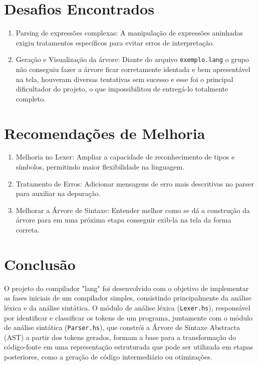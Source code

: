 \documentclass{article}
\begin{document}
\newpage
\section{Desafios Encontrados}
\begin{enumerate}
    \item Parsing de expressões complexas: A manipulação de expressões aninhadas exigiu tratamentos específicos para evitar erros de interpretação. 
    \item Geração e Visualização da árvore: Diante do arquivo \texttt{exemplo.lang} o grupo não conseguiu fazer a árvore ficar corretamente identada e bem apresentável na tela, houveram diversas tentativas sem sucesso e esse foi o principal dificultador do projeto, o que impossibilitou de entregá-lo totalmente completo.
\end{enumerate}

 \section{Recomendações de Melhoria}
 \begin{enumerate}
     \item Melhoria no Lexer: Ampliar a capacidade de reconhecimento de tipos e símbolos, permitindo maior flexibilidade na linguagem. 
    \item Tratamento de Erros: Adicionar mensagens de erro mais descritivas no parser para auxiliar na depuração. 
    \item Melhorar a Árvore de Sintaxe: Entender melhor como se dá a construção da árvore para em uma próxima etapa conseguir exib-la na tela da forma correta.
 \end{enumerate}

\newpage
\section{Conclusão}

O projeto do compilador "lang" foi desenvolvido com o objetivo de implementar as fases iniciais de um compilador simples, consistindo principalmente da análise léxica e da análise sintática. O módulo de análise léxica (\texttt{Lexer.hs}), responsável por identificar e classificar os tokens de um programa, juntamente com o módulo de análise sintática (\texttt{Parser.hs}), que constrói a Árvore de Sintaxe Abstracta (AST) a partir dos tokens gerados, formam a base para a transformação do código-fonte em uma representação estruturada que pode ser utilizada em etapas posteriores, como a geração de código intermediário ou otimizações.
\end{document}

